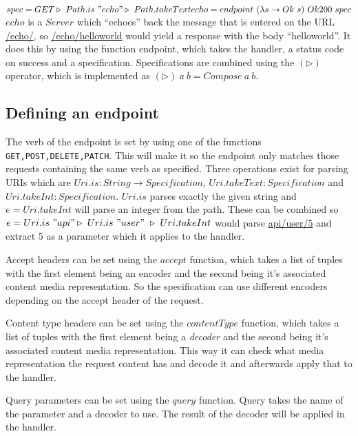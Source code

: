 \noindent
\begin{math}
spec = GET \triangleright\ Path.is\ "echo" \triangleright\ Path.takeText\\
echo = endpoint\ (\lambda s \rightarrow Ok\ s)\ Ok200\ spec
\end{math}\\

$echo$ is a $Server$ which ``echoes'' back the message that is entered on the
URL \url{/echo/}, so \url{/echo/helloworld} would yield a response with the body
``helloworld''. It does this by using the function endpoint, which takes the
handler, a status code on success and a specification.  Specifications are
combined using the $(\triangleright )$ operator, which is implemented as
$(\triangleright)\ a\ b = Compose\ a\ b$.

\subsection{Defining an endpoint}

The verb of the endpoint is set by using one of the functions
\texttt{GET,POST,DELETE,PATCH}. This will make it so the endpoint only matches
those requests containing the same verb as specified.  Three operations exist
for parsing URIs which are $Uri.is : String \rightarrow Specification$,
$Uri.takeText : Specification$ and $Uri.takeInt: Specification$. $Uri.is$ parses
exactly the given string and $e = Uri.takeInt$ will parse an integer from the
path.  These can be combined so $e = Uri.is\ "api" \triangleright\ Uri.is\
"user"\ \triangleright\ Uri.takeInt$ would parse \url{api/user/5} and extract 5
as a parameter which it applies to the handler.

Accept headers can be set using the $accept$ function, which takes a list of
tuples with the first element being an encoder and the second being it's
associated content media representation. So the specification can use different
encoders depending on the accept header of the request.

Content type headers can be set using the $contentType$ function, which takes a
list of tuples with the first element being a \textit{decoder} and the second
being it's associated content media representation. This way it can check what
media representation the request content has and decode it and afterwards apply
that to the handler. 

Query parameters can be set using the $query$ function. Query takes the name of
the parameter and a decoder to use. The result of the decoder will be applied in
the handler.

